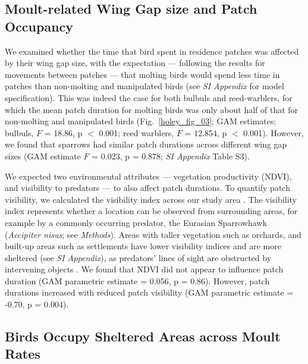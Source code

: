 \subsection*{Moult-related Wing Gap size and Patch Occupancy}

We examined whether the time that bird spent in residence patches was affected by their wing gap size, with the expectation --- following the results for movements between patches --- that molting birds would spend less time in patches than non-molting and manipulated birds (see \textit{SI Appendix} for model specification).
This was indeed the case for both bulbuls and reed-warblers, for which the mean patch duration for molting birds was only about half of that for non-molting and manipulated birds (Fig.~\ref{holey_fig_03}; GAM estimates: bulbuls, $F$ = 18.86, p $<$ 0.001; reed warblers, $F$ = 12.854, p $<$ 0.001).
However, we found that sparrows had similar patch durations across different wing gap sizes (GAM estimate $F$ = 0.023, p = 0.878; \textit{SI Appendix} Table S3).

We expected two environmental attributes --- vegetation productivity (NDVI), and visibility to predators --- to also affect patch durations.
To quantify patch visibility, we calculated the visibility index across our study area \cite{olsoy2015,aben2018,aben2021}.
The visibility index represents whether a location can be observed from surrounding areas, for example by a commonly occurring predator, the Eurasian Sparrowhawk (\textit{Accipiter nisus}; see \textit{Methods}).
Areas with taller vegetation such as orchards, and built-up areas such as settlements have lower visibility indices and are more sheltered (see \textit{SI Appendix}), as predators' lines of sight are obstructed by intervening objects \cite{olsoy2015}.
We found that NDVI did not appear to influence patch duration (GAM parametric estimate = 0.056, p = 0.86).
However, patch durations increased with reduced patch visibility (GAM parametric estimate = -0.70, p = 0.004).

\subsection*{Birds Occupy Sheltered Areas across Moult Rates}

